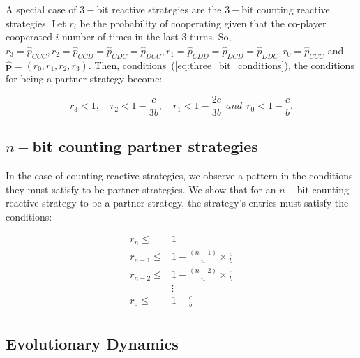 \documentclass{article}
\theoremstyle{definition}
\begin{document}
A special case of $3-$bit reactive strategies are the $3-$bit counting reactive
strategies. Let $r_i$ be the probability of cooperating given that the co-player
cooperated $i$ number of times in the last 3 turns. So, $r_3 = \hat{p}_{CCC},
r_2 = \hat{p}_{CCD} =  \hat{p}_{CDC} = \hat{p}_{DCC}, r_1 = \hat{p}_{CDD} =
\hat{p}_{DCD} =  \hat{p}_{DDC}, r_0 = \hat{p}_{CCC}$ and $\mathbf{\hat{p}}=(r_0,
r_1, r_2, r_3)$. Then, conditions~(\ref{eq:three_bit_conditions}), the
conditions for being a partner strategy become:

\begin{equation}\label{eq:counting_three_bit_conditions}
  \displaystyle r_3 < 1, \quad r_2 < 1-\frac{c}{3b}, \quad r_1 < 1-\frac{2c}{3b} ~~and~~ r_0 < 1\!-\! \frac{c}{b}.
\end{equation}


\subsection{$n-$bit counting partner strategies}

In the case of counting reactive strategies, we observe a pattern in the
conditions they must satisfy to be partner strategies. We show that for an $n-$bit
counting reactive strategy to be a partner strategy, the strategy's entries must
satisfy the conditions:

\begin{align*}
    r_{n}   \leq & 1 \\
    r_{n-1} \leq & 1  - \frac{(n - 1)}{n} \times \frac{c}{b}\\
    r_{n-2} \leq & 1  - \frac{(n - 2)}{n} \times \frac{c}{b}\\
    & \vdots \\
    r_{0} \leq &  1  - \frac{c}{b}\\
\end{align*}

\subsection{Evolutionary Dynamics}
\end{document}
